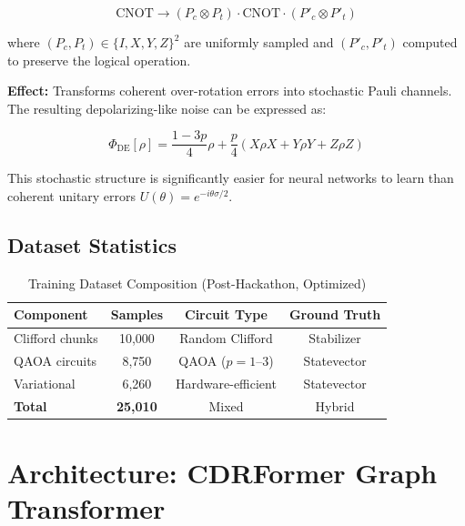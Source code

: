\documentclass[11pt, a4paper]{article}
\begin{document}
\begin{equation}
\text{CNOT} \rightarrow (P_c \otimes P_t) \cdot \text{CNOT} \cdot (P'_c \otimes P'_t)
\end{equation}

where $(P_c, P_t) \in \{I, X, Y, Z\}^2$ are uniformly sampled and
$(P'_c, P'_t)$ computed to preserve the logical operation.

\textbf{Effect:} Transforms coherent over-rotation errors into stochastic
Pauli channels. The resulting depolarizing-like noise can be expressed as:

\begin{equation}
\Phi_{\text{DE}}[\rho] = \frac{1-3p}{4}\rho + \frac{p}{4}(X\rho X + Y\rho Y + Z\rho Z)
\end{equation}

This stochastic structure is significantly easier for neural networks to
learn than coherent unitary errors $U(\theta) = e^{-i\theta\sigma/2}$.

\subsection{Dataset Statistics}

\begin{table}[H]
\centering
\caption{Training Dataset Composition (Post-Hackathon, Optimized)}
\label{tab:dataset}
\begin{tabular}{@{}lccc@{}}
\toprule
\textbf{Component} & \textbf{Samples} & \textbf{Circuit Type} & \textbf{Ground Truth} \\ \midrule
Clifford chunks & 10,000 & Random Clifford & Stabilizer \\
QAOA circuits & 8,750 & QAOA ($p=1$--$3$) & Statevector \\
Variational & 6,260 & Hardware-efficient & Statevector \\
\midrule
\textbf{Total} & \textbf{25,010} & Mixed & Hybrid \\
\bottomrule
\end{tabular}
\end{table}

\section{Architecture: CDRFormer Graph Transformer}
\label{sec:architecture}
\end{document}
